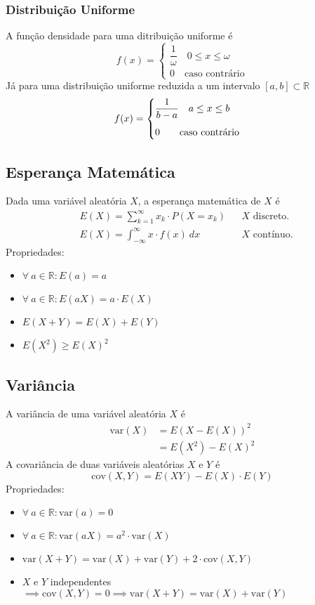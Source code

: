 \documentclass{article}
\begin{document}
\subsubsection{Distribuição Uniforme}
A função densidade para uma ditribuição uniforme é
\[
  f(x) = \begin{cases}
          \dfrac{1}{\omega} \quad 0 \leq x \leq \omega \\[10pt]
          0 \quad \text{caso contrário}
         \end{cases}
\]
Já para uma distribuição uniforme reduzida a um intervalo $[a,b] \subset \mathbb{R}$
\[
  f(x) = \begin{cases}
          \dfrac{1}{b - a} \quad a \leq x \leq b \\[10pt]
          0 \qquad \text{caso contrário}
         \end{cases} \\[10pt]
\]

\pagebreak

\subsection{Esperança Matemática}
Dada uma variável aleatória $X$, a esperança matemática de $X$ é
\begin{align*}
  & E(X) = \sum_{k=1}^{\infty} x_k \cdot P(X = x_k) && \text{$X$ discreto.} \\[5pt]
  & E(X) = \int_{-\infty}^{\infty} x \cdot f(x) \: dx && \text{$X$ contínuo.}
\end{align*}
Propriedades:
\begin{itemize}
  \item $\forall\: a \in \mathbb{R}: E(a) = a$
  \item $\forall\: a \in \mathbb{R}: E(aX) = a \cdot E(X)$
  \item $E(X + Y) = E(X) + E(Y)$
  \item $E(X^2) \geq {E(X)}^2$
\end{itemize}

\subsection{Variância}
A variância de uma variável aleatória $X$ é
\begin{align*}
  \text{var}(X) & = {E(X - E(X))}^2 \\
  & = E(X^2) - {E(X)}^2
\end{align*}
A covariância de duas variáveis aleatórias $X$ e $Y$ é
\[ \text{cov}(X, Y) = E(XY) - E(X) \cdot E(Y) \]
Propriedades:
\begin{itemize}
  \item $\forall\: a \in \mathbb{R}: \text{var}(a) = 0$
  \item $\forall\: a \in \mathbb{R}: \text{var}(aX) = a^2 \cdot \text{var}(X)$
  \item $\text{var}(X + Y) = \text{var}(X) + \text{var}(Y) + 2 \cdot \text{cov}(X, Y)$
  \item $X$ e $Y$ independentes $\implies \text{cov}(X,Y) = 0 \implies \text{var}(X + Y) = \text{var}(X) + \text{var}(Y)$
\end{itemize}
\end{document}
